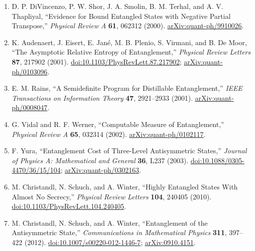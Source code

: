 \begin{enumerate}[label={},leftmargin=4.8em,labelsep=0.5em]
  \footnotesize
  \item[\textup{[DST+00]}]\label{ref:09dc-divincenzo-et-al}
  D. P. DiVincenzo, P. W. Shor, J. A. Smolin, B. M. Terhal, and A. V.
  Thapliyal, ``Evidence for Bound Entangled States with Negative Partial
  Transpose,'' \emph{Physical Review A} \textbf{61}, 062312 (2000).
  \href{https://arxiv.org/abs/quant-ph/9910026}{arXiv:quant-ph/9910026}.

  \item[\textup{[AEA+01]}]\label{ref:09dc-audenaert-et-al}
  K. Audenaert, J. Eisert, E. Jan{\'e}, M. B. Plenio, S. Virmani, and
  B. De Moor, ``The Asymptotic Relative Entropy of Entanglement,''
  \emph{Physical Review Letters} \textbf{87}, 217902 (2001).
  \href{https://doi.org/10.1103/PhysRevLett.87.217902}{doi:10.1103/PhysRevLett.87.217902};
  \href{https://arxiv.org/abs/quant-ph/0103096}{arXiv:quant-ph/0103096}.

  \item[\textup{[Rai01]}]\label{ref:09dc-rains}
  E. M. Rains, ``A Semidefinite Program for Distillable Entanglement,''
  \emph{IEEE Transactions on Information Theory} \textbf{47}, 2921--2933
  (2001).
  \href{https://arxiv.org/abs/quant-ph/0008047}{arXiv:quant-ph/0008047}.

  \item[\textup{[VW02]}]\label{ref:09dc-vidal-werner}
  G. Vidal and R. F. Werner, ``Computable Measure of Entanglement,''
  \emph{Physical Review A} \textbf{65}, 032314 (2002).
  \href{https://arxiv.org/abs/quant-ph/0102117}{arXiv:quant-ph/0102117}.

  \item[\textup{[Yur03]}]\label{ref:09dc-yura}
  F. Yura, ``Entanglement Cost of Three-Level Antisymmetric States,''
  \emph{Journal of Physics A: Mathematical and General} \textbf{36}, L237
  (2003).
  \href{https://doi.org/10.1088/0305-4470/36/15/104}{doi:10.1088/0305-4470/36/15/104};
  \href{https://arxiv.org/abs/quant-ph/0302163}{arXiv:quant-ph/0302163}.

  \item[\textup{[CSW10]}]\label{ref:09dc-csw-prl}
  M. Christandl, N. Schuch, and A. Winter, ``Highly Entangled States With
  Almost No Secrecy,'' \emph{Physical Review Letters} \textbf{104}, 240405
  (2010).
  \href{https://doi.org/10.1103/PhysRevLett.104.240405}{doi:10.1103/PhysRevLett.104.240405}.

  \item[\textup{[CSW12]}]\label{ref:09dc-christandl-schuch-winter}
  M. Christandl, N. Schuch, and A. Winter, ``Entanglement of the
  Antisymmetric State,'' \emph{Communications in Mathematical Physics}
  \textbf{311}, 397--422 (2012).
  \href{https://doi.org/10.1007/s00220-012-1446-7}{doi:10.1007/s00220-012-1446-7};
  \href{https://arxiv.org/abs/0910.4151}{arXiv:0910.4151}.


\end{enumerate}
